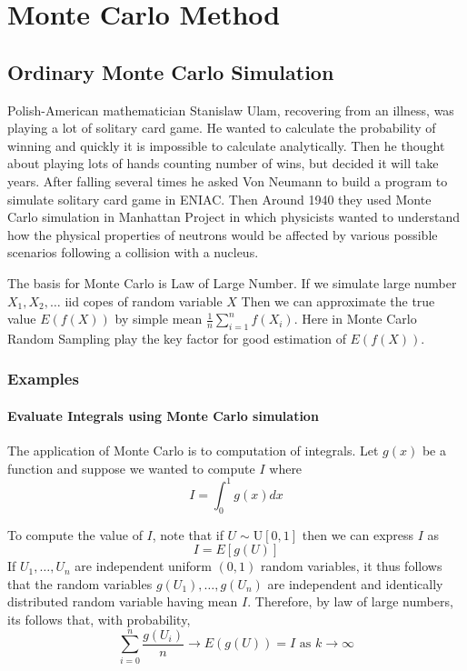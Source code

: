 \chapter{Monte Carlo Method}


\section{Ordinary Monte Carlo Simulation}

Polish-American mathematician Stanislaw Ulam, recovering from an illness, was playing a lot of
solitary card game. He wanted to calculate the probability of winning and
quickly it is impossible to calculate analytically. Then he thought about playing
lots of hands counting number of wins, but decided it will take years.
After falling several times he asked Von Neumann to build a program to simulate solitary
card game in ENIAC. Then Around 1940 they used Monte Carlo simulation in Manhattan Project
in which physicists wanted to understand how the physical
properties of neutrons would be affected by various possible scenarios following a
collision with a nucleus.

The basis for Monte Carlo is Law of Large Number. If we simulate large number $X_1, X_2, \ldots$ iid
copes of random variable $X$ Then we can approximate the true value $E(f(X))$ by simple mean
$\frac{1}{n}\sum_{i=1}^{n} f(X_i)$. Here in Monte Carlo Random Sampling play the key factor for good estimation of $E(f(X))$.


\subsection{Examples}
\subsubsection{Evaluate Integrals using Monte Carlo simulation}
The application of Monte Carlo is to computation of integrals. Let $g(x)$ be a function
and suppose we wanted to compute $I$ where
\[
	I = \int_{0}^{1} g(x) dx
\]

To compute the value of $I$, note that if $U\sim \text{U}[0,1]$ then we can express $I$ as
\[
	I = E[g(U)]
\]
If $U_1, \ldots, U_n$ are independent uniform $(0,1)$ random variables, it thus follows that
the random variables $g(U_1),\ldots,g(U_n)$ are independent and identically distributed random
variable having mean $I$. Therefore, by law of large numbers, its follows that,
with probability,
\[
	\sum_{i = 0}^{n} \frac{g(U_i)}{n} \to E(g(U))= I \text{ as } k \to \infty
\]


